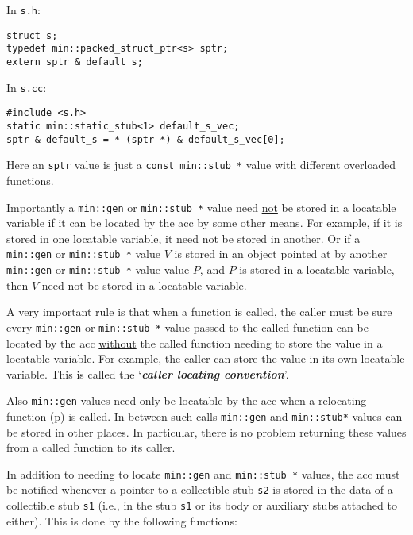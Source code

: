 \documentclass[12pt]{article}
\newcommand{\key}[1]{{\bf \em #1}\index{#1}}
\newcommand{\pagref}[1]{p\pageref{#1}}
\newcommand{\EOL}{\penalty \exhyphenpenalty}
\newenvironment{indpar}[1][0.3in]%
	{\begin{list}{}%
		     {\setlength{\itemsep}{0in}%
		      \setlength{\topsep}{0in}%
		      \setlength{\parsep}{1ex}%
		      \setlength{\labelwidth}{#1}%
		      \setlength{\leftmargin}{#1}%
		      \addtolength{\leftmargin}{\labelsep}}%
	 \item}%
	{\end{list}}
\begin{document}
\begin{indpar}
In \verb|s.h|:
\begin{indpar}\begin{verbatim}
struct s;
typedef min::packed_struct_ptr<s> sptr;
extern sptr & default_s;
\end{verbatim}\end{indpar}

In \verb|s.cc|:
\begin{indpar}\begin{verbatim}
#include <s.h>
static min::static_stub<1> default_s_vec;
sptr & default_s = * (sptr *) & default_s_vec[0];
\end{verbatim}\end{indpar}
\end{indpar}

Here an \verb|sptr| value is just a \verb|const min::stub *| value
with different overloaded functions.

Importantly a \verb|min::gen| or \verb|min::stub *|
value need \underline{not} be stored
in a locatable variable if it can be located by the acc by some
other means.  For example, if it is stored in one locatable variable,
it need not be stored in another.  Or if a \verb|min::gen|
or {\tt min::\EOL stub~*} value
$V$ is stored in an object pointed at by another \verb|min::gen|
or {\tt min::\EOL stub~*} value
value $P$, and $P$ is stored in a locatable variable, then $V$ need not
be stored in a locatable variable.

A very important rule is that when a function is called, the caller
must be sure every \verb|min::gen|
or {\tt min::\EOL stub~*} value passed to the called
function can be located by the acc \underline{without} the called
function needing to store the value in a locatable variable.
For example, the caller can store the value in its own locatable
variable.  This is called the `\key{caller locating convention}'.

Also \verb|min::gen| values need only be locatable by
the acc when a relocating function (\pagref{RELOCATING-FUNCTIONS})
is called.  In between such calls \verb|min::gen|
and {\tt min::\EOL stub*} values can be
stored in other places.  In particular, there is no problem
returning these values from a called function to its caller.

In addition to needing to locate \verb|min::gen|
and {\tt min::\EOL stub~*} values, the acc
must be notified whenever a pointer to a collectible stub \verb|s2|
is stored in the data of a collectible stub \verb|s1| (i.e., in
the stub \verb|s1| or its body or auxiliary stubs attached to either).
This is done by the following functions:
\end{document}
